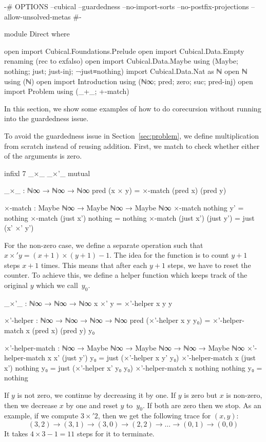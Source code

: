 \begin{code}[hide]
{-# OPTIONS --cubical --guardedness --no-import-sorts --no-postfix-projections --allow-unsolved-metas #-}

module Direct where

open import Cubical.Foundations.Prelude
open import Cubical.Data.Empty
  renaming (rec to exfalso)
open import Cubical.Data.Maybe using (Maybe; nothing; just; just-inj; ¬just≡nothing)
import Cubical.Data.Nat as ℕ
open ℕ using (ℕ)
open import Introduction using (ℕ∞; pred; zero; suc; pred-inj)
open import Problem using (_+_; +-match)
\end{code}
In this section, we show some examples of how to do corecursion without running
into the guardedness issue.

To avoid the guardedness issue in Section~\ref{sec:problem}, we define
multiplication from scratch instead of reusing addition. First, we match to
check whether either of the arguments is zero.
\begin{code}[hide]
infixl 7 _×_ _×'_
mutual
\end{code}
\begin{code}
  _×_ : ℕ∞ → ℕ∞ → ℕ∞
  pred (x × y) = ×-match (pred x) (pred y)

  ×-match : Maybe ℕ∞ → Maybe ℕ∞ → Maybe ℕ∞
  ×-match nothing    y'         = nothing
  ×-match (just x')  nothing    = nothing
  ×-match (just x')  (just y')  = just (x' ×' y')
\end{code}
For the non-zero case, we define a separate operation 
such that $x\times'y = (x+1)\times(y+1)-1$. The idea for the function is to
count $y+1$ steps $x+1$ times. This means that after each $y+1$ steps, we have
to reset the counter. To achieve this, we define a helper function which keeps
track of the original $y$ which we call~$y_0$.
\begin{code}
  _×'_ : ℕ∞ → ℕ∞ → ℕ∞
  x ×' y = ×'-helper x y y

  ×'-helper : ℕ∞ → ℕ∞ → ℕ∞ → ℕ∞
  pred (×'-helper x y y₀) =
    ×'-helper-match x (pred x) (pred y) y₀

  ×'-helper-match :
    ℕ∞ → Maybe ℕ∞ → Maybe ℕ∞ → ℕ∞ →
    Maybe ℕ∞
  ×'-helper-match x x' (just y') y₀ =
    just (×'-helper x y' y₀)
  ×'-helper-match x (just x') nothing y₀ =
    just (×'-helper x' y₀ y₀)
  ×'-helper-match x nothing nothing y₀ =
    nothing
\end{code}
If $y$ is not zero, we continue by decreasing it by one. If $y$ is zero but $x$
is non-zero, then we decrease $x$ by one and reset $y$ to~$y_0$. If both are
zero then we stop. As an example, if we compute $3 \times' 2$, then we get the
following trace for $(x, y)$:
\[
  (3,2) \to (3,1) \to (3,0) \to (2,2) \to \dots \to (0,1) \to (0,0)
\]
It takes $4 \times 3 - 1 = 11$ steps for it to terminate.

